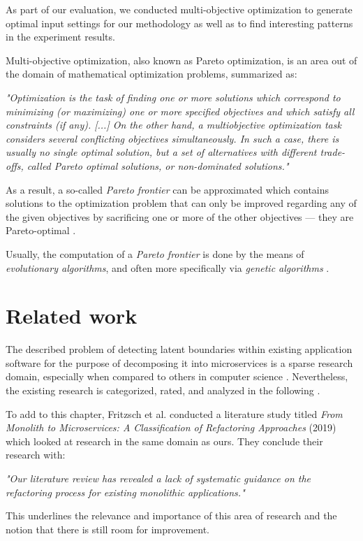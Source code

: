 \documentclass[12pt,a4paper]{report}
\begin{document}
As part of our evaluation, we conducted multi\hyp objective optimization to
generate optimal input settings for our methodology as well as to find
interesting patterns in the experiment results.

Multi-objective optimization, also known as Pareto optimization, is an area
out of the domain of mathematical optimization problems, summarized as:
\begin{displayquote}
  \emph{
  "Optimization is the task of finding one or more solutions which correspond to
  minimizing (or maximizing) one or more specified objectives and which satisfy
  all constraints (if any). [...] On the other hand, a multiobjective
  optimization task considers several conflicting objectives simultaneously.
  In such a case, there is usually no single optimal solution, but a set of
  alternatives with different trade-offs, called Pareto optimal solutions,
  or non-dominated solutions."
  }~\cite{deb2014multi}
\end{displayquote}

As a result, a so-called \textit{Pareto frontier} can be approximated which
contains solutions to the optimization problem that can only be improved
regarding any of the given objectives by sacrificing one or more of the other
objectives --- they are Pareto\hyp optimal \cite{deb2014multi}.

Usually, the computation of a \textit{Pareto frontier} is done by the means of
\textit{evolutionary algorithms}, and often more specifically via
\textit{genetic algorithms} \cite{deb2014multi}.




\chapter{Related work} \label{chap:related}

The described problem of detecting latent boundaries within existing
application software for the purpose of decomposing it into microservices is a
sparse research domain, especially when compared to others in computer science
\cite{fritzsch2018monolith}. Nevertheless, the existing research is
categorized, rated, and analyzed in the following
\textit{}.

To add to this chapter, Fritzsch et al. conducted a literature study titled
\textit{From Monolith to Microservices: A Classification of Refactoring
Approaches} (2019) \cite{fritzsch2018monolith} which looked at research in the
same domain as ours. They conclude their research with:
\begin{displayquote}
  \emph{
  "Our literature review has revealed a lack of systematic guidance on the
  refactoring process for existing monolithic applications."
  }~\cite{fritzsch2018monolith}
\end{displayquote}
This underlines the relevance and importance of this area of research
and the notion that there is still room for improvement.
\end{document}
